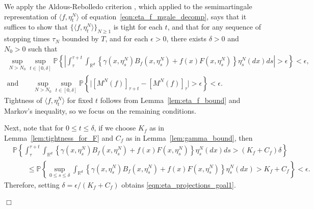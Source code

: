\documentclass[12pt]{article}
\newenvironment {proof}{{\noindent\bf Proof }}{\hfill $\Box$ \medskip}
\newcommand{\IP}{\mathbb P}
\newcommand{\IR}{\mathbb R}
\begin{document}
\begin{proof}
We apply the Aldous-Rebolledo criterion \citep{rebolledo:1980}, which 
applied to the semimartingale representation of $\langle f, \eta^N_t\rangle$
of equation~\eqref{eqn:eta_f_mgale_decomp},
says that it suffices to show that 
$\{\langle f, \eta^N_t \rangle\}_{N \ge 1}$ is tight for each $t$, and that
for any sequence of stopping times $\tau_N$ bounded by $T$,
and for each $\epsilon > 0$, there exists $\delta > 0$ and $N_0 > 0$ such that 
\begin{gather}
        \label{eqn:eta_projections_goal1}
    \sup_{N > N_0}
    \sup_{t \in [0, \delta]}
    \IP\left\{\left|
            \int_\tau^{\tau + t}
            \int_{\IR^d}
            \left\{
                \gamma(x, \eta^N_s) B_f(x, \eta^N_s)
                + f(x) F(x, \eta^N_s)
            \right\} 
            \eta^N_s(dx)
            ds
        \right|> \epsilon \right\}
        < \epsilon ,
    \\ \text{and} \qquad
        \label{eqn:eta_projections_goal2}
    \sup_{N > N_0}
    \sup_{t \in [0, \delta]}
    \IP\left\{\big|
        [M^{N}(f)]_{\tau + t} 
            - [M^{N}(f)]_\tau \big|
        > \epsilon
    \right\}
    < \epsilon.
\end{gather}
Tightness of $\langle f, \eta^N_t\rangle$ for fixed $t$
follows from Lemma~\ref{lem:eta_f_bound} and Markov's inequality,
so we focus on the remaining conditions.

Next, note that for $0 \le t \le \delta$,
if we choose $K_f$ as in Lemma~\ref{lem:tightness_for_F}
and $C_f$ as in Lemma~\ref{lem:gamma_bound},
then
\begin{align*}
    &
    \IP\left\{
        \int_\tau^{\tau + t}
        \int_{\IR^d}
        \left\{
            \gamma(x, \eta^N_s) B_f(x, \eta^N_s)
            + f(x) F(x, \eta^N_s)
        \right\} 
        \eta^N_s(dx)
        ds
        > (K_f + C_f) \delta
    \right\}
    \\ & \qquad \le
    \IP\left\{
        \sup_{0 \le s \le \delta}
        \int_{\IR^d} \left\{
            \gamma(x, \eta^N_s) B_f(x, \eta^N_s)
            + f(x) F(x, \eta^N_s)
        \right\} \eta^N_s(dx)
        >
        K_f + C_f
    \right\}
    < \epsilon .
\end{align*}
Therefore, setting $\delta = \epsilon / (K_f + C_f)$
obtains \eqref{eqn:eta_projections_goal1}.


\end{proof}
\end{document}
